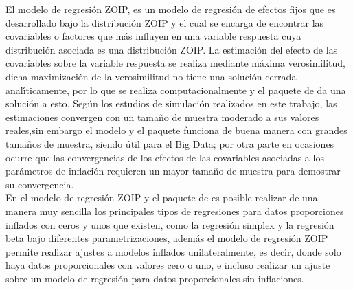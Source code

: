 El modelo de regresi\'{o}n ZOIP, es un modelo de regresi\'{o}n de efectos fijos que es desarrollado bajo la distribuci\'{o}n ZOIP y el cual se encarga de encontrar las covariables o factores que m\'{a}s influyen en una variable respuesta cuya distribuci\'{o}n asociada es una distribuci\'{o}n ZOIP. La estimaci\'{o}n del efecto de las covariables sobre la variable respuesta se realiza mediante m\'{a}xima verosimilitud, dicha maximizaci\'{o}n de la verosimilitud no tiene una soluci\'{o}n cerrada anal\'{\i}ticamente, por lo que se realiza computacionalmente y el paquete  de  da una soluci\'{o}n a esto. Seg\'{u}n los estudios de simulaci\'{o}n realizados en este trabajo, las estimaciones convergen con un tama\~{n}o de muestra moderado a sus valores reales,sin embargo el modelo y el paquete funciona de buena manera con grandes tama\~{n}os de muestra, siendo \'{u}til para el Big Data; por otra parte en ocasiones ocurre que las convergencias de los efectos de las covariables asociadas a los par\'{a}metros de inflaci\'{o}n requieren un mayor tama\~{n}o de muestra para demostrar su convergencia.\\

En el modelo de regresi\'{o}n ZOIP y el paquete  de  es posible realizar de una ma\-ne\-ra muy sencilla los principales tipos de regresiones para datos proporciones inflados con ceros y unos que existen, como la regresi\'{o}n simplex y la regresi\'{o}n beta bajo diferentes parametrizaciones, adem\'{a}s el modelo de regresi\'{o}n ZOIP permite realizar ajustes a modelos inflados unilateralmente, es decir, donde solo haya datos proporcionales con valores cero o uno, e incluso realizar un ajuste sobre un modelo de regresi\'{o}n para datos proporcionales sin inflaciones.

